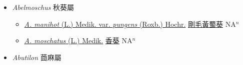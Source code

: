 
  \begin{itemize}
 \item[] \textit{Abelmoschus} 秋葵屬
                    
  \begin{itemize}
        \item[] \href{http://www.theplantlist.org/tpl1.1/search?q=Abelmoschus+manihot+var.+pungens}{\textit{A. manihot} (L.) Medik. var. \textit{pungens} (Roxb.) Hochr.}   \href{\detokenize{http://taibnet.sinica.edu.tw/chi/taibnet_species_list.php?T2=剛毛黃蜀葵&T2_new_value=true&fr=y}}{剛毛黃蜀葵} NA$^n$
        \item[] \href{http://www.theplantlist.org/tpl1.1/search?q=Abelmoschus+moschatus}{\textit{A. moschatus} (L.) Medik.}   \href{\detokenize{http://taibnet.sinica.edu.tw/chi/taibnet_species_list.php?T2=香葵&T2_new_value=true&fr=y}}{香葵} NA$^n$
  \end{itemize}
 \item[] \textit{Abutilon} 莔麻屬
                    

\end{itemize}
